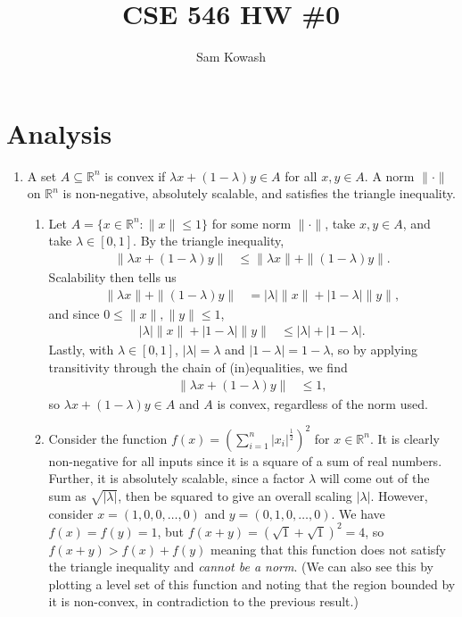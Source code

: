 \documentclass[11pt,letterpaper]{article}
\author{Sam Kowash}
\title{CSE 546 HW \#0}
\numberwithin{equation}{section}
\numberwithin{figure}{section}
\begin{document}
\maketitle

\section{Analysis}
\begin{enumerate}
	\item A set $A \subseteq \mathbb{R}^n$ is convex if $\lambda x + (1-\lambda)y \in A$ for all $x,y\in A$. A norm $\|\cdot\|$ on $\mathbb{R}^n$ is non-negative, absolutely scalable, and satisfies the triangle inequality.
		\begin{enumerate}
		\item 
		Let $A = \{x \in \mathbb{R}^n : \|x\| \leq 1\}$ for some norm $\|\cdot\|$, take $x,y \in A$, and take $\lambda \in [0,1]$. By the triangle inequality,
		\begin{align*}
			\|\lambda x + (1-\lambda)y\| &\leq \|\lambda x\| + \|(1-\lambda)y\|.
		\end{align*}
		Scalability then tells us
		\begin{align*}
			 \|\lambda x\| + \|(1-\lambda)y\| &= |\lambda| \|x\| + |1-\lambda|\|y\|,
		\end{align*}
		and since $0 \leq \|x\|,\|y\| \leq 1$,
		\begin{align*}
			|\lambda| \|x\| + |1-\lambda|\|y\| &\leq |\lambda| + |1-\lambda|.
		\end{align*}
		Lastly, with $\lambda \in [0,1]$, $|\lambda|=\lambda$ and $|1-\lambda|=1-\lambda$, so by applying transitivity through the chain of (in)equalities, we find
		\begin{align*}
			\|\lambda x + (1-\lambda)y\| &\leq 1,
		\end{align*}
		so $\lambda x + (1-\lambda)y \in A$ and $A$ is convex, regardless of the norm used.




		\item
		Consider the function $f(x) = \left(\sum_{i=1}^n |x_i|^\frac{1}{2}\right)^2$ for $x\in \mathbb{R}^n$. It is clearly non-negative for all inputs since it is a square of a sum of real numbers. Further, it is absolutely scalable, since a factor $\lambda$ will come out of the sum as $\sqrt{|\lambda|}$, then be squared to give an overall scaling $|\lambda|$. However, consider $x = (1,0,0,\ldots,0)$ and $y = (0,1,0,\ldots,0)$. We have $f(x)= f(y) = 1$, but $f(x+y) = (\sqrt{1}+\sqrt{1})^2 = 4$, so $f(x+y) > f(x)+f(y)$ meaning that this function does not satisfy the triangle inequality and \emph{cannot be a norm}. (We can also see this by plotting a level set of this function and noting that the region bounded by it is non-convex, in contradiction to the previous result.)
	\end{enumerate}




\end{enumerate}
\end{document}
